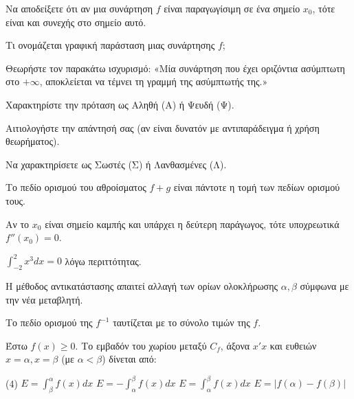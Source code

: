 \documentclass[11pt,a4paper]{article}
\newcommand{\kerkissans}[1]{{\fontfamily{maksf}\selectfont \textbf{#1}}}
\renewcommand{\textdexiakeraia}{}
\newcommand{\dint}{\displaystyle\int}
\newcommand\themanum{A}
\newcounter{thema}[section]
\renewcommand{\thethema}{\arabic{thema}}
\newcommand{\Thema}{\refstepcounter{thema}{\textbf{\textcolor{black}{\faPenSquare\ \  \large \kerkissans{\textbf{\thethemaο\hspace{2mm}Διαγώνισμα - Θέμα \themanum}}}}}\hspace{0mm}}{}
\newenvironment{thema}[1]
{\begin{tcolorbox}[title=\Thema\kerkissans{\textbf{\large{  #1}}},breakable,
enhanced standard,titlerule=0pt,toprule=0pt, rightrule=0pt, bottomrule=0pt,
colback=white,left=0mm,top=1mm,bottom=0mm,
boxrule=0pt,
colframe=white,leftrule=0mm,sharp corners,coltitle=black]
\renewcommand{\themanum}{#1}}
{\end{tcolorbox}}
\begin{document}
\begin{thema}{A}
\begin{erwthma}
    \item Να αποδείξετε ότι αν μια συνάρτηση $f$ είναι παραγωγίσιμη σε ένα σημείο $x_0$, τότε είναι και συνεχής στο σημείο αυτό.
    \item Τι ονομάζεται γραφική παράσταση μιας συνάρτησης $f$;
    \item Θεωρήστε τον παρακάτω ισχυρισμό:
    «Μία συνάρτηση που έχει οριζόντια ασύμπτωτη στο $+\infty$, αποκλείεται να τέμνει τη γραμμή της ασύμπτωτής της.»
    \begin{alist}
    \item Χαρακτηρίστε την πρόταση ως Αληθή (Α) ή Ψευδή (Ψ).
    \item Αιτιολογήστε την απάντησή σας (αν είναι δυνατόν με αντιπαράδειγμα ή χρήση θεωρήματος).
    \end{alist}
    \item Να χαρακτηρίσετε ως Σωστές (Σ) ή Λανθασμένες (Λ).
    \begin{alist}
        \item Το πεδίο ορισμού του αθροίσματος $f+g$ είναι πάντοτε η τομή των πεδίων ορισμού τους.
        \item Αν το $x_0$ είναι σημείο καμπής και υπάρχει η δεύτερη παράγωγος, τότε υποχρεωτικά $f''(x_0) = 0$.
        \item $\dint_{-2}^{2} x^3 dx = 0$ λόγω περιττότητας.
        \item Η μέθοδος αντικατάστασης απαιτεί αλλαγή των ορίων ολοκλήρωσης $\alpha, \beta$ σύμφωνα με την νέα μεταβλητή.
        \item Το πεδίο ορισμού της $f^{-1}$ ταυτίζεται με το σύνολο τιμών της $f$.
    \end{alist}
    \item Έστω $f(x) \ge 0$. Το εμβαδόν του χωρίου μεταξύ $C_f$, άξονα $x'x$ και ευθειών $x=\alpha, x=\beta$ (με $\alpha<\beta$) δίνεται από:
    \begin{tasks}[label=\let\textdexiakeraia\relax\alph*.](4)
        \task $E = \dint_\beta^\alpha f(x) dx$
        \task $E = - \dint_\alpha^\beta f(x) dx$
        \task $E = \dint_\alpha^\beta f(x) dx$
        \task $E = |f(\alpha) - f(\beta)|$
    \end{tasks}
\end{erwthma}
\end{thema}
\vspace{1cm}
\end{document}
